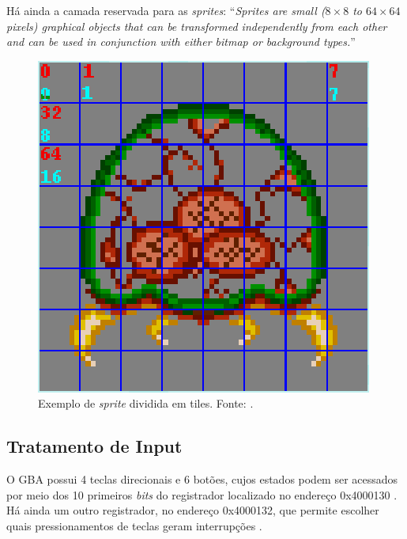     Há ainda a camada reservada para as \textit{sprites}: ``\textit{Sprites are small ($8\times8$ to $64\times64$ pixels) graphical objects that can be transformed independently from each other and can be used in conjunction with either bitmap or background types.}'' \cite[p. 38]{tonc}

    \begin{figure}[H]
    \centering \includegraphics[keepaspectratio=true,scale=0.6]{figuras/metroid-sprite.eps}
      \caption[Exemplo de \textit{sprite} dividida em tiles]
        {Exemplo de \textit{sprite} dividida em tiles. Fonte: \cite{tonc}.}
      \label{metroid-sprite}
    \end{figure}

  \subsection{Tratamento de Input}

    O GBA possui 4 teclas direcionais e 6 botões, cujos estados podem ser acessados por meio dos 10 primeiros \textit{bits} do registrador localizado no endereço 0x4000130 \cite{gbatek}. Há ainda um outro registrador, no endereço 0x4000132, que permite escolher quais pressionamentos de teclas geram interrupções \cite{cowbite}.

